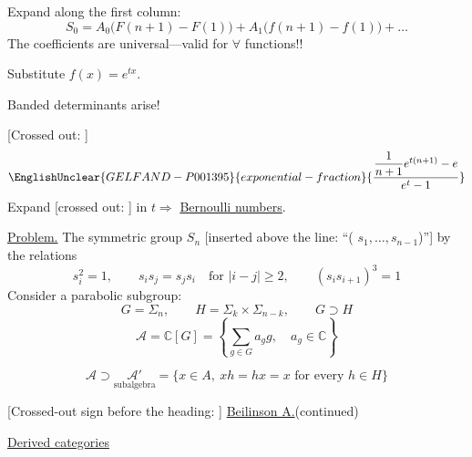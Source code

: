 Expand along the first column:
\begin{equation*}
S_0=A_0\bigl(F(n+1)-F(1)\bigr)
+A_1\bigl(f(n+1)-f(1)\bigr)+\ldots
\end{equation*}
The coefficients are universal---valid for $\forall$ functions!!

Substitute $f(x)=e^{tx}$.

Banded determinants arise!

[Crossed out:
]
\begin{equation*}
\EnglishUnclear{GELFAND-P001395}{exponential-fraction}{\frac{\dfrac{1}{n+1}e^{t(n+1)}-e}{e^t-1}}
\end{equation*}
Expand [crossed out:
]
in $t$\quad $\Longrightarrow$ \underline{Bernoulli numbers}.

\underline{Problem.} The symmetric group $S_n$
[inserted above the line: ``( $s_1,\ldots,s_{n-1}$)'']
by the relations
\begin{equation*}
s_i^2=1,\qquad s_i s_j=s_j s_i\quad\text{for }|i-j|\ge2,
\qquad (s_i s_{i+1})^3=1
\end{equation*}
Consider a parabolic subgroup:
\begin{equation*}
G=\Sigma_n,\qquad H=\Sigma_k\times\Sigma_{n-k},\qquad G\supset H
\end{equation*}
\begin{equation*}
\mathcal A=\mathbb C[G]=
\left\{\sum_{g\in G}a_g g,\quad a_g\in\mathbb C\right\}
\end{equation*}


\begin{equation*}
\mathcal A\supset
\underset{\text{subalgebra}}{\mathcal A'}
=\{x\in A,\ xh=hx=x\text{ for every }h\in H\}
\end{equation*}

[Crossed-out sign before the heading:
]
\underline{Beilinson A.}\quad (continued)

\underline{Derived categories}


